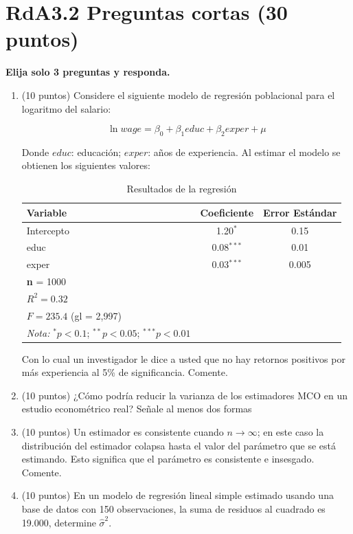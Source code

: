 \documentclass[10pt,a4paper]{article}
\begin{document}
\section{RdA3.2  Preguntas cortas (30 puntos)}
{\bf Elija solo 3 preguntas y responda. }
\begin{enumerate}
   \item   (10 puntos) 
   Considere el siguiente modelo de regresión poblacional para el logaritmo del salario:
    
    $$\ln{wage} = \beta_0 + \beta_1 educ + \beta_2 exper + \mu$$
    
    Donde $educ$: educación; $exper$: años de experiencia. Al estimar el modelo se obtienen los siguientes valores:
    \begin{table}[H] 
    \centering
    \caption{Resultados de la regresión}
    \begin{tabular}{lcc}
    \hline
    \hline
    \textbf{Variable} & \textbf{Coeficiente} & \textbf{Error Estándar} \\
    \hline
    Intercepto & 1.20$^{*}$ & 0.15 \\
    educ & 0.08$^{***}$ & 0.01 \\
    exper & 0.03$^{***}$ & 0.005 \\
    \hline
    \multicolumn{3}{l}{\textbf{n} = 1000} \\
    \multicolumn{3}{l}{$R^2 = 0.32$} \\
    \multicolumn{3}{l}{$F = 235.4$ (gl = 2,997)} \\
    \hline
    \hline
    \textit{Nota:} $^{*}p<0.1$; $^{**}p<0.05$; $^{***}p<0.01$
    \end{tabular}
    \end{table}
    
    {Con lo cual un investigador le dice a usted que no hay retornos positivos por más experiencia al 5\% de significancia. Comente.}

     \item (10 puntos) ¿Cómo podría reducir la varianza de los estimadores MCO en un estudio econométrico real? Señale al menos dos formas

      \item 
    (10 puntos) Un estimador es consistente cuando $n \longrightarrow \infty$; en este caso la distribución del estimador colapsa hasta el valor del parámetro que se está estimando. Esto significa que el parámetro es consistente e insesgado. Comente.

      \item (10 puntos)  En un modelo de regresión lineal simple estimado usando una base de datos con  150 observaciones, la suma de residuos al cuadrado es 19.000, determine  $\hat{\sigma}^2$.
    \end{enumerate}
\end{document}
